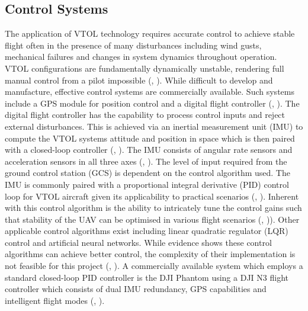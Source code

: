 \subsection{Control Systems}

The application of VTOL technology requires accurate control to achieve stable flight often in the  presence of many disturbances including wind gusts, mechanical failures and changes in system dynamics throughout operation. VTOL configurations are fundamentally dynamically unstable, rendering full manual control from a pilot impossible (\citeauthor{vervoorst2016modular}, \citeyear{vervoorst2016modular}). While difficult to develop and manufacture, effective control systems are commercially available. Such systems include a GPS module for position control and a digital flight controller (\citeauthor{vervoorst2016modular}, \citeyear{vervoorst2016modular}). The digital flight controller has the capability to process control inputs and reject external disturbances. This is achieved via an inertial measurement unit (IMU) to compute the VTOL systems attitude and position in space which is then paired with a closed-loop controller (\citeauthor{vervoorst2016modular}, \citeyear{vervoorst2016modular}). The IMU consists of angular rate sensors and acceleration sensors in all three axes (\citeauthor{vervoorst2016modular}, \citeyear{vervoorst2016modular}). The level of input required from the ground control station (GCS) is dependent on the control algorithm used. The IMU is commonly paired with a proportional integral derivative (PID) control loop for VTOL aircraft given its applicability to practical scenarios (\citeauthor{ccakici2016control}, \citeyear{ccakici2016control}). Inherent with this control algorithm is the ability to intricately tune the control gains such that stability of the UAV can be optimised in various flight scenarios (\citeauthor{ccakici2016control}, \citeyear{ccakici2016control})). Other applicable control algorithms exist including linear quadratic regulator (LQR) control and artificial neural networks. While evidence shows these control algorithms can achieve better control, the complexity of their implementation is not feasible for this project (\citeauthor{zulu2016review}, \citeyear{zulu2016review}). A commercially available system which employs a standard closed-loop PID controller is the DJI Phantom using a DJI N3 flight controller which consists of dual IMU redundancy, GPS capabilities and intelligent flight modes  (\citeauthor{djin3}, \citeyear{djin3}).



